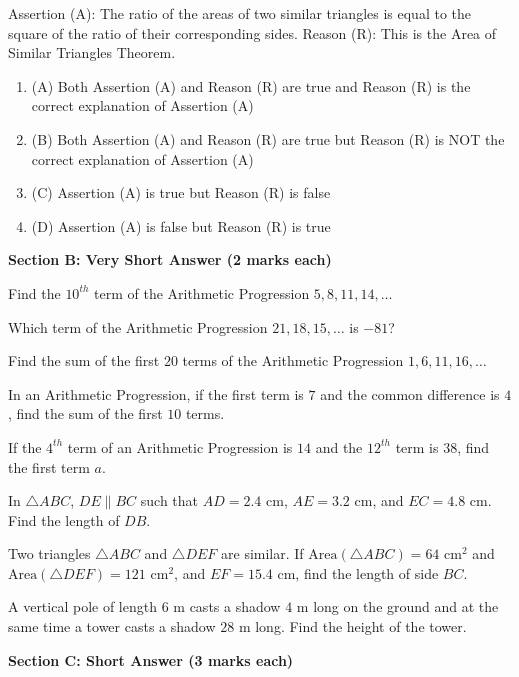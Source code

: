 \documentclass[12pt,a4paper]{exam}
\begin{document}
\begin{questions}
\question[1] Assertion (A): The ratio of the areas of two similar triangles is equal to the square of the ratio of their corresponding sides. Reason (R): This is the Area of Similar Triangles Theorem.
\begin{enumerate}[label=(\Alph*)]
  \item (A) Both Assertion (A) and Reason (R) are true and Reason (R) is the correct explanation of Assertion (A)
  \item (B) Both Assertion (A) and Reason (R) are true but Reason (R) is NOT the correct explanation of Assertion (A)
  \item (C) Assertion (A) is true but Reason (R) is false
  \item (D) Assertion (A) is false but Reason (R) is true
\end{enumerate}
\vspace{0.15cm}

\end{questions}
\bigskip
\noindent\textbf{\large Section B: Very Short Answer (2 marks each)}

\begin{questions}
\question[2] Find the $10^{th}$ term of the Arithmetic Progression $5, 8, 11, 14, \dots$
\vspace{0.15cm}

\question[2] Which term of the Arithmetic Progression $21, 18, 15, \dots$ is $-81$?
\vspace{0.15cm}

\question[2] Find the sum of the first $20$ terms of the Arithmetic Progression $1, 6, 11, 16, \dots$
\vspace{0.15cm}

\question[2] In an Arithmetic Progression, if the first term is $7$ and the common difference is $4$, find the sum of the first $10$ terms.
\vspace{0.15cm}

\question[2] If the $4^{th}$ term of an Arithmetic Progression is $14$ and the $12^{th}$ term is $38$, find the first term $a$.
\vspace{0.15cm}

\question[2] In $\triangle ABC$, $DE \parallel BC$ such that $AD = 2.4\text{ cm}$, $AE = 3.2\text{ cm}$, and $EC = 4.8\text{ cm}$. Find the length of $DB$.
\vspace{0.15cm}

\question[2] Two triangles $\triangle ABC$ and $\triangle DEF$ are similar. If $\text{Area}(\triangle ABC) = 64\text{ cm}^2$ and $\text{Area}(\triangle DEF) = 121\text{ cm}^2$, and $EF = 15.4\text{ cm}$, find the length of side $BC$.
\vspace{0.15cm}

\question[2] A vertical pole of length $6\text{ m}$ casts a shadow $4\text{ m}$ long on the ground and at the same time a tower casts a shadow $28\text{ m}$ long. Find the height of the tower.
\vspace{0.15cm}

\end{questions}
\bigskip
\noindent\textbf{\large Section C: Short Answer (3 marks each)}
\end{document}
